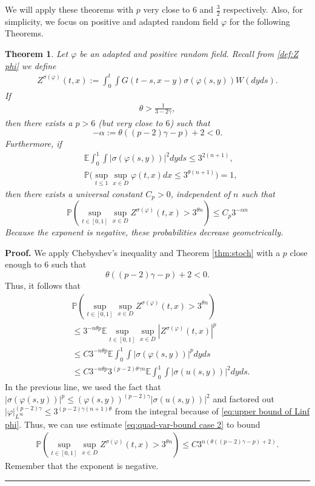 \documentclass[12pt]{article}
\newtheorem{theorem}{Theorem}
\newenvironment{proof}[1][Proof]{\noindent\textbf{#1.} }{\ \rule{0.5em}{0.5em}}
\numberwithin{equation}{section}
\begin{document}
We will apply these theorems with $p$ very close to $6$ and $\frac{3}{2}$ respectively. Also, for simplicity, we focus on positive and adapted random field $\varphi$ for the following Theorems.
\begin{theorem}\label{thm:Stochastic estimate case 2}
Let $\varphi$ be an adapted and positive random field. Recall from \eqref{def:Z phi} we define
\begin{align}
    Z^{\sigma(\varphi)}(t,x) := \int_0^t\int G(t-s,x-y)\sigma(\varphi(s,y))W(dyds).\label{def:Z phi case 2}
\end{align}
If
\begin{align}
    \theta> \frac{1}{3-2\gamma}, \label{eq:theta-lower-1}
\end{align}
then there exists a $p>6$ (but very close to $6$) such that
	\[-\alpha:= \theta((p-2)\gamma -p) + 2 <0.\]
Furthermore, if 
\begin{align}
    &\mathbb{E} \int_0^1 \int |\sigma(\varphi(s,y))|^2dyds \leq 3^{2(n+1)},\label{eq:quad-var-bound case 2}\\
    &\mathbb{P}\Big(\sup_{t\leq 1}\sup_{x\in D}\varphi(t,x)dx\leq 3^{\theta(n+1)}\Big)=1,\label{eq:upper bound of Linf phi}
\end{align}
	then there exists a universal constant $C_p>0$, independent of $n$ such that
	\begin{equation}
		\mathbb{P}\left(\sup_{t \in [0,1]} \sup_{x \in D} Z^{\sigma(\varphi)}(t,x)> 3^{\theta n}\right) \leq C_p 3^{-\alpha n}\label{eq:P for Zphi}
	\end{equation}
    Because the exponent is negative, these probabilities decrease geometrically.
\end{theorem}
\begin{proof}
    We apply Chebyshev's inequality and Theorem \ref{thm:stoch} with a $p$ close enough to $6$ such that
	\[\theta((p-2)\gamma -p) + 2 <0.\]
    Thus, it follows that 
	\begin{align}
		&\mathbb{P}\left(\sup_{t \in [0,1]} \sup_{x \in D} Z^{\sigma(\varphi)}(t,x)> 3^{\theta n}\right) \nonumber\\
		&\leq 3^{-n\theta p} \mathbb{E} \sup_{t \in [0, 1]}\sup_{x \in D} |Z^{\sigma(\varphi)}(t,x)|^p  \nonumber\\
		&\leq C 3^{-n\theta p}  \mathbb{E} \int_0^{1} \int  |\sigma(\varphi(s,y))|^pdyds \nonumber\\
		&\leq C 3^{-n \theta p} 3^{(p-2)\theta \gamma n} \mathbb{E} \int_0^{1} \int |\sigma(u(s,y))|^2dyds.
 	\end{align}
 	In the previous line, we used the fact that $|\sigma(\varphi(s,y))|^p\leq(\varphi(s,y))^{(p-2)\gamma}|\sigma(u(s,y))|^2 $ and factored out $|\varphi|_{L^\infty}^{(p-2)\gamma} \leq 3^{ (p-2)\gamma (n+1) \theta}$ from the integral because of \eqref{eq:upper bound of Linf phi}. 
    Thus, we can use  estimate \eqref{eq:quad-var-bound case 2} to bound
 	\begin{align}
 		\mathbb{P}\left(\sup_{t \in [0,1]} \sup_{x \in D} Z^{\sigma(\varphi)}(t,x)> 3^{\theta n}\right) \leq C 3^{n(\theta((p-2)\gamma - p)+2)}.
 	\end{align}
 	Remember that the exponent is negative.
\end{proof}
\end{document}
